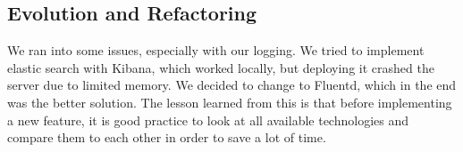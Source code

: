 \subsection{Evolution and Refactoring}

We ran into some issues, especially with our logging.
We tried to implement elastic search with Kibana, which worked locally, but deploying it crashed the server due to limited memory.
We decided to change to Fluentd, which in the end was the better solution.
The lesson learned from this is that before implementing a new feature, it is good practice to look at all available technologies and compare them to each other in order to save a lot of time.
